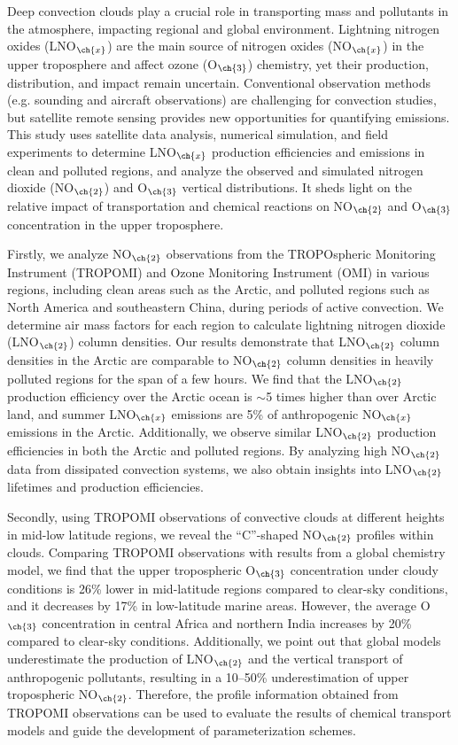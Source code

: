 {
Deep convection clouds play a crucial role in transporting mass and pollutants in the atmosphere, impacting regional and global environment.
Lightning nitrogen oxides (LNO$_{\ch{x}}$) are the main source of nitrogen oxides (NO$_{\ch{x}}$) in the upper troposphere
and affect ozone (O$_{\ch{3}}$) chemistry, yet their production, distribution, and impact remain uncertain.
Conventional observation methods (e.g. sounding and aircraft observations) are challenging for convection studies,
but satellite remote sensing provides new opportunities for quantifying emissions.
This study uses satellite data analysis, numerical simulation, and field experiments to determine LNO$_{\ch{x}}$ production efficiencies and emissions in clean and polluted regions,
and analyze the observed and simulated nitrogen dioxide (NO$_{\ch{2}}$) and O$_{\ch{3}}$ vertical distributions.
It sheds light on the relative impact of transportation and chemical reactions on NO$_{\ch{2}}$ and O$_{\ch{3}}$ concentration in the upper troposphere.

Firstly, we analyze NO$_{\ch{2}}$ observations from the TROPOspheric Monitoring Instrument (TROPOMI) and
Ozone Monitoring Instrument (OMI) in various regions, including clean areas such as the Arctic, and polluted regions such as North America and southeastern China, during periods of active convection.
We determine air mass factors for each region to calculate lightning nitrogen dioxide (LNO$_{\ch{2}}$) column densities.
Our results demonstrate that LNO$_{\ch{2}}$ column densities in the Arctic are comparable to NO$_{\ch{2}}$ column densities in heavily polluted regions for the span of a few hours.
We find that the LNO$_{\ch{2}}$ production efficiency over the Arctic ocean is $\sim$5 times higher than over Arctic land, and summer LNO$_{\ch{x}}$ emissions are 5\% of anthropogenic NO$_{\ch{x}}$ emissions in the Arctic.
Additionally, we observe similar LNO$_{\ch{2}}$ production efficiencies in both the Arctic and polluted regions.
By analyzing high NO$_{\ch{2}}$ data from dissipated convection systems, we also obtain insights into LNO$_{\ch{2}}$ lifetimes and production efficiencies.

Secondly, using TROPOMI observations of convective clouds at different heights in mid-low latitude regions, we reveal the ``C''-shaped NO$_{\ch{2}}$ profiles within clouds.
Comparing TROPOMI observations with results from a global chemistry model, we find that the upper tropospheric O$_{\ch{3}}$ concentration under cloudy conditions is 26\% lower in mid-latitude regions compared to clear-sky conditions, and it decreases by 17\% in low-latitude marine areas.
However, the average O$_{\ch{3}}$ concentration in central Africa and northern India increases by 20\% compared to clear-sky conditions.
Additionally, we point out that global models underestimate the production of LNO$_{\ch{2}}$ and the vertical transport of anthropogenic pollutants, resulting in a 10--50\% underestimation of upper tropospheric NO$_{\ch{2}}$.
Therefore, the profile information obtained from TROPOMI observations can be used to evaluate the results of chemical transport models and guide the development of parameterization schemes.

}
